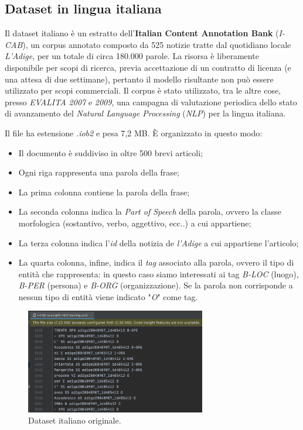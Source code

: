 \documentclass[a4paper,11pt]{article}
\begin{document}
\subsection{Dataset in lingua italiana}
Il dataset italiano è un estratto dell'\textbf{Italian Content Annotation Bank} (\textit{I-CAB}), un corpus annotato composto da 525 notizie tratte dal quotidiano locale \textit{L'Adige}, per un totale di circa 180.000 parole. La risorsa è liberamente disponibile per scopi di ricerca, previa accettazione di un contratto di licenza (e una attesa di due settimane), pertanto il modello risultante non può essere utilizzato per scopi commerciali.
Il corpus è stato utilizzato, tra le altre cose, presso \textit{EVALITA 2007} e \textit{2009}, una campagna di valutazione periodica dello stato di avanzamento del \textit{Natural Language Processing} (\textit{NLP}) per la lingua italiana. \cite{dataset-it}
\newline

Il file ha estensione \textit{.iob2} e pesa 7,2 MB. È organizzato in questo modo:

\begin{itemize}
	\item Il documento è suddiviso in oltre 500 brevi articoli;
	\item Ogni riga rappresenta una parola della frase;
	\item La prima colonna contiene la parola della frase;
	\item La seconda colonna indica la \textit{Part of Speech} della parola, ovvero la classe morfologica (sostantivo, verbo, aggettivo, ecc..) a cui appartiene;
	\item La terza colonna indica l'\textit{id} della notizia de \textit{l'Adige} a cui appartiene l'articolo;
	\item La quarta colonna, infine, indica il \textit{tag} associato alla parola, ovvero il tipo di entità che rappresenta: in questo caso siamo interessati ai tag \textit{B-LOC} (luogo), \textit{B-PER} (persona) e \textit{B-ORG} (organizzazione). Se la parola non corrisponde a nessun tipo di entità viene indicato "\textit{O}" come tag.
\end{itemize}

\begin{figure}[H]
\centering
\includegraphics[width=0.7\textwidth]{img/dataset-it-orig}
\caption{Dataset italiano originale.}
\label{fig:dataset_it_orig}
\end{figure}
\end{document}
